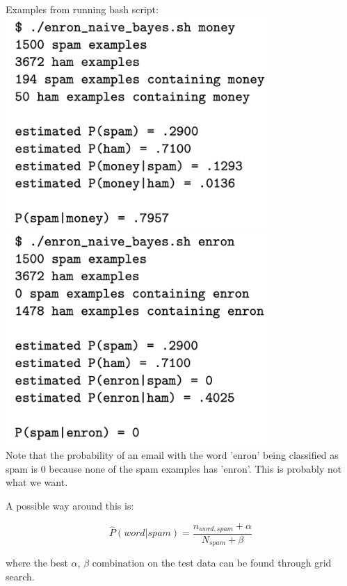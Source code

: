 Examples from running bash script: \\

\includegraphics[width=100mm, scale=0.5]{figures/ex1.png}\\
\includegraphics[width=100mm, scale=0.5]{figures/ex2.png}\\

Note that the probability of an email with the word 'enron' being classified as spam is 0 because none of the spam examples has 'enron'. This is probably not what we want. 

A possible way around this is: 

$$\hat{P}(word | spam) = \frac{n_{word, spam} + \alpha }{N_{spam} + \beta}$$

where the best $\alpha$, $\beta$ combination on the test data can be found through grid search.

